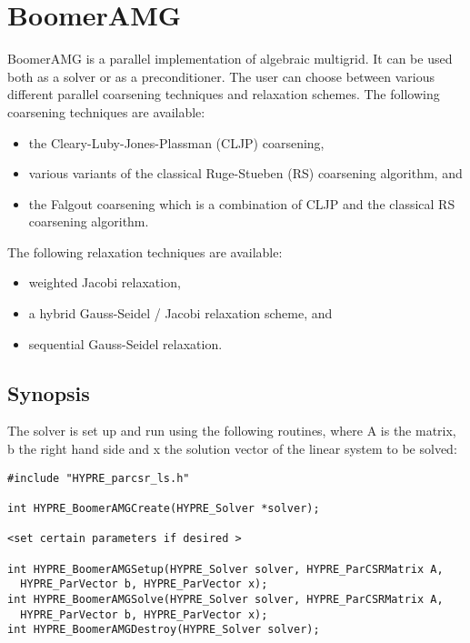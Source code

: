 \section{BoomerAMG}

BoomerAMG is a parallel implementation of algebraic multigrid.
It can be used both as a solver or as a preconditioner.
The user can choose between various different parallel coarsening techniques
and relaxation schemes.
The following coarsening techniques are available:
\begin{itemize}
\item the Cleary-Luby-Jones-Plassman (CLJP) coarsening,
\item various variants of the classical Ruge-Stueben (RS) coarsening algorithm, and
\item the Falgout coarsening which is a combination of CLJP and the
classical RS coarsening algorithm.
\end{itemize}
The following relaxation techniques are available:
\begin{itemize}
\item weighted Jacobi relaxation,
\item a hybrid Gauss-Seidel / Jacobi relaxation scheme, and
\item sequential Gauss-Seidel relaxation.
\end{itemize}

\subsection{Synopsis}

The solver is set up and run using the following routines,
where A is the matrix, b the right hand side and x the solution vector
of the linear system to be solved:

\begin{display}
\begin{verbatim}
#include "HYPRE_parcsr_ls.h"

int HYPRE_BoomerAMGCreate(HYPRE_Solver *solver); 

<set certain parameters if desired >

int HYPRE_BoomerAMGSetup(HYPRE_Solver solver, HYPRE_ParCSRMatrix A,
  HYPRE_ParVector b, HYPRE_ParVector x);
int HYPRE_BoomerAMGSolve(HYPRE_Solver solver, HYPRE_ParCSRMatrix A,
  HYPRE_ParVector b, HYPRE_ParVector x);
int HYPRE_BoomerAMGDestroy(HYPRE_Solver solver);
\end{verbatim}
\end{display}

